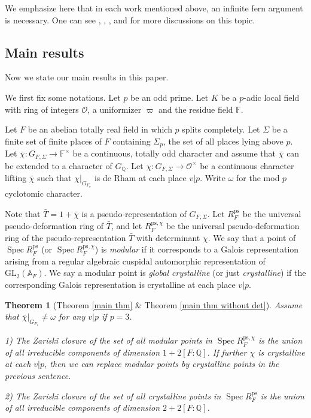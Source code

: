 \documentclass[a4paper, 12pt]{amsart}
\newtheorem{thm}{Theorem}[subsection]
\DeclareMathOperator{\Spec}{Spec}
\def\ps{\mathrm{ps}}
\newcommand{\F}{\mathbb{F}}
\newcommand{\Q}{\mathbb{Q}}
\newcommand{\A}{\mathbb{A}}
\newcommand{\GL}{\mathrm{GL}}
\newcommand{\cO}{\mathcal{O}}
\begin{document}
	We emphasize here that in each work mentioned above, an infinite fern argument is necessary. One can see \cite{gouvea}, \cite{chenevier2011}, \cite{Emerton2011}, \cite{Hellmann_2022} and \cite{Hernandez:2022aa} for more discussions on this topic.
	
	\subsection{Main results}
	Now we state our main results in this paper.
	
	We first fix some notations. Let $p$ be an odd prime. Let $K$ be a $p$-adic local field with ring of integers $\cO$, a uniformizer $\varpi$ and the residue field $\F$.
	
	Let $F$ be an abelian totally real field in which $p$ splits completely. Let $\Sigma$ be a finite set of finite places of $F$ containing $\Sigma_p$, the set of all places lying above $p$. Let $\bar{\chi}: G_{F, \Sigma} \to \F^\times$ be a continuous, totally odd character and assume that $\bar{\chi}$ can be extended to a character of $G_\Q$. Let $\chi: G_{F, \Sigma} \to \cO^\times $ be a continuous character lifting $\bar{\chi}$ such that $\chi|_{G_{F_v}}$ is de Rham at each place $v|p$. Write $\omega $ for the mod $p$ cyclotomic character.
	
	Note that $\bar{T}=1+\bar{\chi}$ is a pseudo-representation of $G_{F, \Sigma}$. Let $R_F^\ps$ be the universal pseudo-deformation ring of $\bar{T} $, and let $R_F^{\ps, \chi}$ be the universal pseudo-deformation ring of the pseudo-representation $\bar{T} $ with determinant $\chi$. We say that a point of $\Spec R_F^\ps$ (or $\Spec R_F^{\ps, \chi}$) is \textit{modular} if it corresponds to a Galois representation arising from a regular algebraic cuspidal automorphic representation of $\GL_2(\A_{F})$. We say a modular point is \textit{global crystalline} (or just \textit{crystalline}) if the corresponding Galois representation is crystalline at each place $v|p$.
	
	\begin{thm} [Theorem \ref{main thm} \& Theorem \ref{main thm without det}]\label{main}
		Assume that $\bar{\chi}|_{G_{F_v}} \ne \omega$ for any $v|p$ if $p=3$.
		
		1) The Zariski closure of the set of all modular points in $\Spec R_F^{\ps, \chi}$ is the union of all irreducible components of dimension $1+2[F:\Q]$. If further $\chi$ is crystalline at each $v|p$, then we can replace modular points by crystalline points in the previous sentence.
		
		2) The Zariski closure of the set of all crystalline points in $\Spec R_F^\ps$ is the union of all irreducible components of dimension $2+2[F:\Q]$.
	\end{thm}
	
\end{document}

